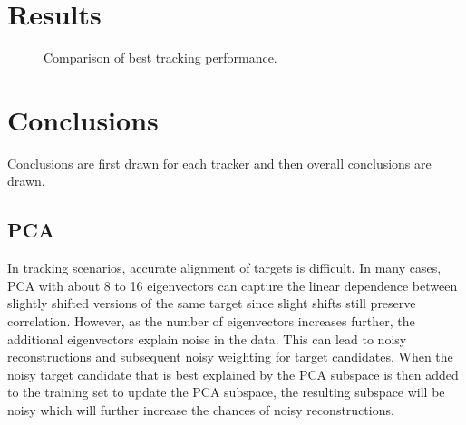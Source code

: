 \section{Results}
\begin{figure}[h!]
\centering

\caption{Comparison of best tracking performance.}
\label{fig:Table_1__best}
\end{figure}



\section{Conclusions}
Conclusions are first drawn for each tracker and then overall conclusions are drawn.

\subsection{PCA}
In tracking scenarios, accurate alignment of targets is difficult.  In many cases, PCA with about 8 to 16 eigenvectors can capture the linear dependence between slightly shifted versions of the same target since slight shifts still preserve correlation.  However, as the number of eigenvectors increases further, the additional eigenvectors explain noise in the data.  This can lead to noisy reconstructions and subsequent noisy weighting for target candidates.  When the noisy target candidate that is best explained by the PCA subspace is then added to the training set to update the PCA subspace, the resulting subspace will be noisy which will further increase the chances of noisy reconstructions.  

